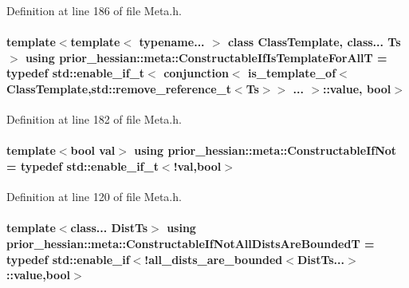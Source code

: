 Definition at line 186 of file Meta.\+h.

\paragraph[{\texorpdfstring{Constructable\+If\+Is\+Template\+For\+AllT}{ConstructableIfIsTemplateForAllT}}]{\setlength{\rightskip}{0pt plus 5cm}template$<$template$<$ typename... $>$ class Class\+Template, class... Ts$>$ using {\bf prior\+\_\+hessian\+::meta\+::\+Constructable\+If\+Is\+Template\+For\+AllT} = typedef std\+::enable\+\_\+if\+\_\+t$<$ {\bf conjunction}$<$ {\bf is\+\_\+template\+\_\+of}$<$Class\+Template,std\+::remove\+\_\+reference\+\_\+t$<$Ts$>$$>$ ... $>$\+::value, bool$>$}\hypertarget{namespaceprior__hessian_1_1meta_a48175b9bfd69aa8a555323c758403a62}{}\label{namespaceprior__hessian_1_1meta_a48175b9bfd69aa8a555323c758403a62}


Definition at line 182 of file Meta.\+h.

\paragraph[{\texorpdfstring{Constructable\+If\+Not}{ConstructableIfNot}}]{\setlength{\rightskip}{0pt plus 5cm}template$<$bool val$>$ using {\bf prior\+\_\+hessian\+::meta\+::\+Constructable\+If\+Not} = typedef std\+::enable\+\_\+if\+\_\+t$<$!val,bool$>$}\hypertarget{namespaceprior__hessian_1_1meta_a23667341714ecaa72ef51dafae35ee60}{}\label{namespaceprior__hessian_1_1meta_a23667341714ecaa72ef51dafae35ee60}


Definition at line 120 of file Meta.\+h.

\paragraph[{\texorpdfstring{Constructable\+If\+Not\+All\+Dists\+Are\+BoundedT}{ConstructableIfNotAllDistsAreBoundedT}}]{\setlength{\rightskip}{0pt plus 5cm}template$<$class... Dist\+Ts$>$ using {\bf prior\+\_\+hessian\+::meta\+::\+Constructable\+If\+Not\+All\+Dists\+Are\+BoundedT} = typedef std\+::enable\+\_\+if$<$!{\bf all\+\_\+dists\+\_\+are\+\_\+bounded}$<$Dist\+Ts...$>$\+::value,bool$>$}\hypertarget{namespaceprior__hessian_1_1meta_a33414fea85f38ec07f5b6a750be5656b}{}\label{namespaceprior__hessian_1_1meta_a33414fea85f38ec07f5b6a750be5656b}


